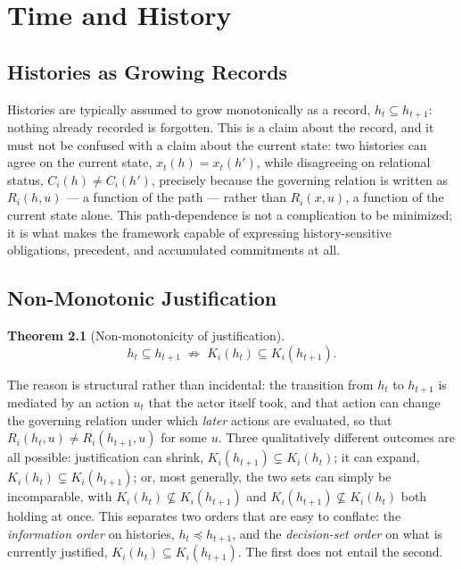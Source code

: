 \documentclass[11pt]{report}
\theoremstyle{definition}
\theoremstyle{plain}
\newtheorem{theorem}[definition]{Theorem}
\begin{document}
\part{Time and History}

\chapter{Histories as Growing Records}

Histories are typically assumed to grow monotonically as a record, $h_t \subseteq h_{t+1}$: nothing already recorded is forgotten. This is a claim about the record, and it must not be confused with a claim about the current state: two histories can agree on the current state, $x_t(h) = x_t(h')$, while disagreeing on relational status, $C_i(h) \neq C_i(h')$, precisely because the governing relation is written as $R_i(h,u)$ --- a function of the path --- rather than $R_i(x,u)$, a function of the current state alone. This path-dependence is not a complication to be minimized; it is what makes the framework capable of expressing history-sensitive obligations, precedent, and accumulated commitments at all.

\chapter{Non-Monotonic Justification}

\begin{theorem}[Non-monotonicity of justification]
\[
h_t \subseteq h_{t+1} \;\not\Rightarrow\; K_i(h_t) \subseteq K_i(h_{t+1}).
\]
\end{theorem}

The reason is structural rather than incidental: the transition from $h_t$ to $h_{t+1}$ is mediated by an action $u_t$ that the actor itself took, and that action can change the governing relation under which \emph{later} actions are evaluated, so that $R_i(h_t, u) \neq R_i(h_{t+1}, u)$ for some $u$. Three qualitatively different outcomes are all possible: justification can shrink, $K_i(h_{t+1}) \subsetneq K_i(h_t)$; it can expand, $K_i(h_t) \subsetneq K_i(h_{t+1})$; or, most generally, the two sets can simply be incomparable, with $K_i(h_t) \not\subseteq K_i(h_{t+1})$ and $K_i(h_{t+1}) \not\subseteq K_i(h_t)$ both holding at once. This separates two orders that are easy to conflate: the \emph{information order} on histories, $h_t \preceq h_{t+1}$, and the \emph{decision-set order} on what is currently justified, $K_i(h_t) \subseteq K_i(h_{t+1})$. The first does not entail the second.
\end{document}

